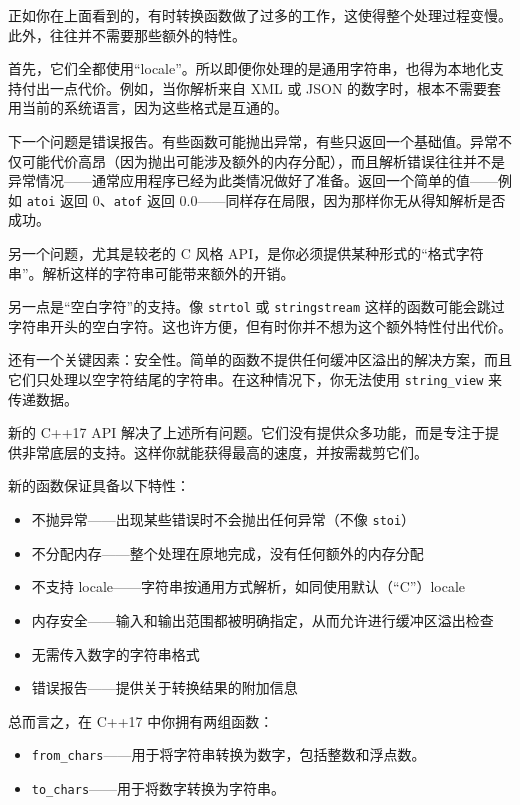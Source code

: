 正如你在上面看到的，有时转换函数做了过多的工作，这使得整个处理过程变慢。此外，往往并不需要那些额外的特性。

首先，它们全都使用“locale”。所以即便你处理的是通用字符串，也得为本地化支持付出一点代价。例如，当你解析来自 XML 或 JSON 的数字时，根本不需要套用当前的系统语言，因为这些格式是互通的。

下一个问题是错误报告。有些函数可能抛出异常，有些只返回一个基础值。异常不仅可能代价高昂（因为抛出可能涉及额外的内存分配），而且解析错误往往并不是异常情况——通常应用程序已经为此类情况做好了准备。返回一个简单的值——例如 \texttt{atoi} 返回 0、\texttt{atof} 返回 0.0——同样存在局限，因为那样你无从得知解析是否成功。

另一个问题，尤其是较老的 C 风格 API，是你必须提供某种形式的“格式字符串”。解析这样的字符串可能带来额外的开销。

另一点是“空白字符”的支持。像 \texttt{strtol} 或 \texttt{stringstream} 这样的函数可能会跳过字符串开头的空白字符。这也许方便，但有时你并不想为这个额外特性付出代价。

还有一个关键因素：安全性。简单的函数不提供任何缓冲区溢出的解决方案，而且它们只处理以空字符结尾的字符串。在这种情况下，你无法使用 \texttt{string\_view} 来传递数据。

新的 C++17 API 解决了上述所有问题。它们没有提供众多功能，而是专注于提供非常底层的支持。这样你就能获得最高的速度，并按需裁剪它们。

新的函数保证具备以下特性：
\begin{itemize}
\item 不抛异常——出现某些错误时不会抛出任何异常（不像 \texttt{stoi}）
\item 不分配内存——整个处理在原地完成，没有任何额外的内存分配
\item 不支持 locale——字符串按通用方式解析，如同使用默认（“C”）locale
\item 内存安全——输入和输出范围都被明确指定，从而允许进行缓冲区溢出检查
\item 无需传入数字的字符串格式
\item 错误报告——提供关于转换结果的附加信息
\end{itemize}

总而言之，在 C++17 中你拥有两组函数：
\begin{itemize}
\item \texttt{from\_chars}——用于将字符串转换为数字，包括整数和浮点数。
\item \texttt{to\_chars}——用于将数字转换为字符串。
\end{itemize}

